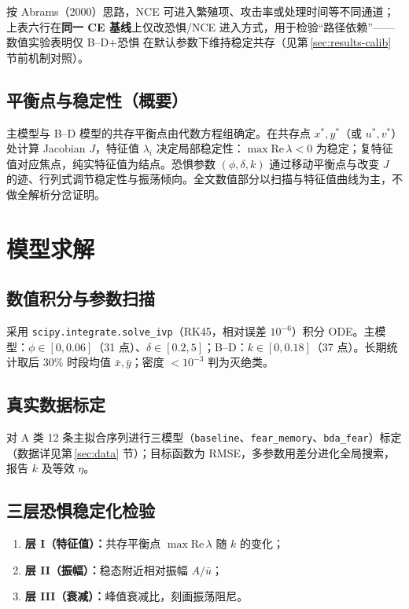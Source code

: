 \documentclass[12pt,a4paper]{ctexart}
\newcommand{\modeltrio}{三模型（\texttt{baseline}、\texttt{fear\_memory}、\texttt{bda\_fear}）}
\begin{document}
按 Abrams（2000）思路，NCE 可进入繁殖项、攻击率或处理时间等不同通道；上表六行在\textbf{同一 CE 基线}上仅改恐惧/NCE 进入方式，用于检验“路径依赖”——数值实验表明仅 B--D+恐惧 在默认参数下维持稳定共存（见第\,\ref{sec:results-calib} 节前机制对照）。

\subsection{平衡点与稳定性（概要）}

主模型与 B--D 模型的共存平衡点由代数方程组确定。在共存点 $x^*,y^*$（或 $u^*,v^*$）处计算 Jacobian $J$，特征值 $\lambda_i$ 决定局部稳定性：$\max\mathrm{Re}\,\lambda<0$ 为稳定；复特征值对应焦点，纯实特征值为结点。恐惧参数 $(\phi,\delta,k)$ 通过移动平衡点与改变 $J$ 的迹、行列式调节稳定性与振荡倾向。全文数值部分以扫描与特征值曲线为主，不做全解析分岔证明。

\section{模型求解}

\subsection{数值积分与参数扫描}

采用 \texttt{scipy.integrate.solve\_ivp}（RK45，相对误差 $10^{-6}$）积分 ODE。主模型：$\phi\in[0,0.06]$（31 点）、$\delta\in[0.2,5]$；B--D：$k\in[0,0.18]$（37 点）。长期统计取后 30\% 时段均值 $\bar{x},\bar{y}$；密度 $<10^{-3}$ 判为灭绝类。

\subsection{真实数据标定}

对 A 类 12 条主拟合序列进行\modeltrio{}标定（数据详见第\,\ref{sec:data} 节）；目标函数为 RMSE，多参数用差分进化全局搜索，报告 $k$ 及等效 $\eta$。

\subsection{三层恐惧稳定化检验}

\begin{enumerate}[label=(\Roman*),leftmargin=2em]
  \item \textbf{层 I（特征值）：}共存平衡点 $\max\mathrm{Re}\,\lambda$ 随 $k$ 的变化；
  \item \textbf{层 II（振幅）：}稳态附近相对振幅 $A/\bar{u}$；
  \item \textbf{层 III（衰减）：}峰值衰减比，刻画振荡阻尼。
\end{enumerate}
\end{document}
